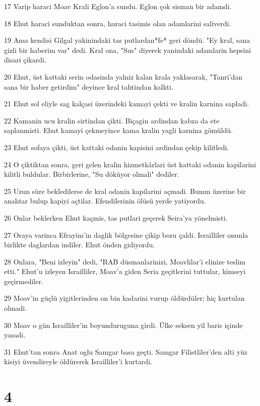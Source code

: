 \par 17 Varip haraci Moav Krali Eglon'a sundu. Eglon çok sisman bir adamdi.
\par 18 Ehut haraci sunduktan sonra, haraci tasimis olan adamlarini saliverdi.
\par 19 Ama kendisi Gilgal yakinindaki tas putlardan*fe* geri döndü. "Ey kral, sana gizli bir haberim var" dedi. Kral ona, "Sus" diyerek yanindaki adamlarin hepsini disari çikardi.
\par 20 Ehut, üst kattaki serin odasinda yalniz kalan krala yaklasarak, "Tanri'dan sana bir haber getirdim" deyince kral tahtindan kalkti.
\par 21 Ehut sol eliyle sag kalçasi üzerindeki kamayi çekti ve kralin karnina sapladi.
\par 22 Kamanin ucu kralin sirtindan çikti. Biçagin ardindan kabza da ete saplanmisti. Ehut kamayi çekmeyince kama kralin yagli karnina gömüldü.
\par 23 Ehut sofaya çikti, üst kattaki odanin kapisini ardindan çekip kilitledi.
\par 24 O çiktiktan sonra, geri gelen kralin hizmetkârlari üst kattaki odanin kapilarini kilitli buldular. Birbirlerine, "Su döküyor olmali" dediler.
\par 25 Uzun süre bekledilerse de kral odanin kapilarini açmadi. Bunun üzerine bir anahtar bulup kapiyi açtilar. Efendilerinin ölüsü yerde yatiyordu.
\par 26 Onlar beklerken Ehut kaçmis, tas putlari geçerek Seira'ya yönelmisti.
\par 27 Oraya varinca Efrayim'in daglik bölgesine çikip boru çaldi. Israilliler onunla birlikte daglardan indiler. Ehut önden gidiyordu.
\par 28 Onlara, "Beni izleyin" dedi, "RAB düsmanlarinizi, Moavlilar'i elinize teslim etti." Ehut'u izleyen Israilliler, Moav'a giden Seria geçitlerini tuttular, kimseyi geçirmediler.
\par 29 Moav'in güçlü yigitlerinden on bin kadarini vurup öldürdüler; hiç kurtulan olmadi.
\par 30 Moav o gün Israilliler'in boyunduruguna girdi. Ülke seksen yil baris içinde yasadi.
\par 31 Ehut'tan sonra Anat oglu Samgar basa geçti. Samgar Filistliler'den alti yüz kisiyi üvendireyle öldürerek Israilliler'i kurtardi.

\chapter{4}

